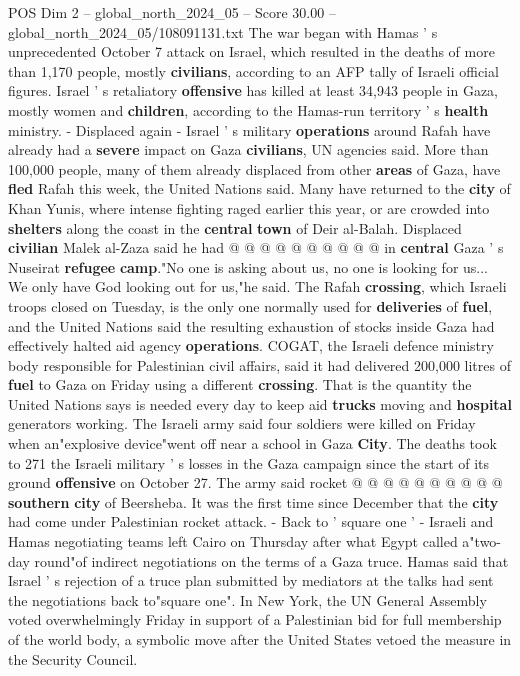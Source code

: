 \begin{textsample}{POS Dim 2 – global\_north\_2024\_05 – Score 30.00 – global\_north\_2024\_05/108091131.txt}
The war began with Hamas ' s unprecedented October 7 attack on Israel, which resulted in the deaths of more than 1,170 people, mostly \textbf{civilians}, according to an AFP tally of Israeli official figures.
Israel ' s retaliatory \textbf{offensive} has killed at least 34,943 people in Gaza, mostly women and \textbf{children}, according to the Hamas-run territory ' s \textbf{health} ministry. - Displaced again - Israel ' s military \textbf{operations} around Rafah have already had a \textbf{severe} impact on Gaza \textbf{civilians}, UN agencies said.
More than 100,000 people, many of them already displaced from other \textbf{areas} of Gaza, have \textbf{fled} Rafah this week, the United Nations said.
Many have returned to the \textbf{city} of Khan Yunis, where intense fighting raged earlier this year, or are crowded into \textbf{shelters} along the coast in the \textbf{central} \textbf{town} of Deir al-Balah.
Displaced \textbf{civilian} Malek al-Zaza said he had @ @ @ @ @ @ @ @ @ @ in \textbf{central} Gaza ' s Nuseirat \textbf{refugee} \textbf{camp}."No one is asking about us, no one is looking for us...
We only have God looking out for us,"he said.
The Rafah \textbf{crossing}, which Israeli troops closed on Tuesday, is the only one normally used for \textbf{deliveries} of \textbf{fuel}, and the United Nations said the resulting exhaustion of stocks inside Gaza had effectively halted aid agency \textbf{operations}.
COGAT, the Israeli defence ministry body responsible for Palestinian civil affairs, said it had delivered 200,000 litres of \textbf{fuel} to Gaza on Friday using a different \textbf{crossing}.
That is the quantity the United Nations says is needed every day to keep aid \textbf{trucks} moving and \textbf{hospital} generators working.
The Israeli army said four soldiers were killed on Friday when an"explosive device"went off near a school in Gaza \textbf{City}.
The deaths took to 271 the Israeli military ' s losses in the Gaza campaign since the start of its ground \textbf{offensive} on October 27.
The army said rocket @ @ @ @ @ @ @ @ @ @ \textbf{southern} \textbf{city} of Beersheba.
It was the first time since December that the \textbf{city} had come under Palestinian rocket attack. - Back to ' square one ' - Israeli and Hamas negotiating teams left Cairo on Thursday after what Egypt called a"two-day round"of indirect negotiations on the terms of a Gaza truce.
Hamas said that Israel ' s rejection of a truce plan submitted by mediators at the talks had sent the negotiations back to"square one".
In New York, the UN General Assembly voted overwhelmingly Friday in support of a Palestinian bid for full membership of the world body, a symbolic move after the United States vetoed the measure in the Security Council.

\end{textsample}
